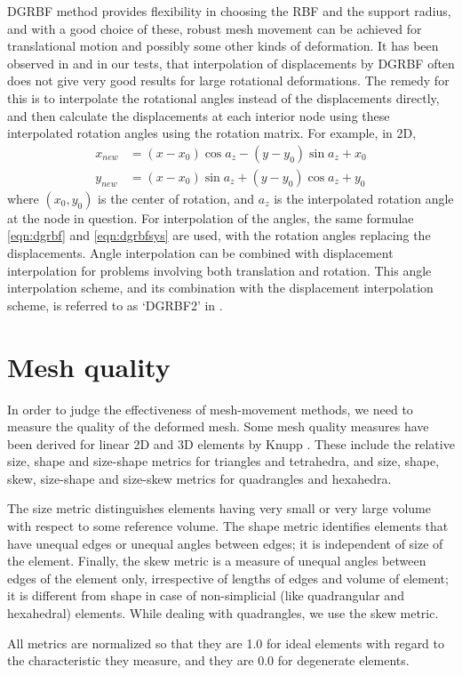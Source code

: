  DGRBF method provides flexibility in choosing the RBF and the support radius, and with a good choice of these, robust mesh movement can be achieved for translational motion and possibly some other kinds of deformation. It has been observed in \cite{mm:dgrbf} and in our tests, that interpolation of displacements by DGRBF often does not give very good results for large rotational deformations. The remedy for this is to interpolate the rotational angles instead of the displacements directly, and then calculate the displacements at each interior node using these interpolated rotation angles using the rotation matrix. For example, in 2D,
 \begin{align}
 x_{new} &= (x-x_0)\cos a_z - (y-y_0)\sin a_z + x_0 \\
 y_{new} &= (x-x_0)\sin a_z + (y-y_0)\cos a_z + y_0
 \end{align}
 where $(x_0,y_0)$ is the center of rotation, and $a_z$ is the interpolated rotation angle at the node in question. For interpolation of the angles, the same formulae \eqref{eqn:dgrbf} and \eqref{eqn:dgrbfsys} are used, with the rotation angles replacing the displacements. Angle interpolation can be combined with displacement interpolation for problems involving both translation and rotation. This angle interpolation scheme, and its combination with the displacement interpolation scheme, is referred to as `DGRBF2' in \cite{mm:dgrbf}.
 
 \section{Mesh quality}
 
 In order to judge the effectiveness of mesh-movement methods, we need to measure the quality of the deformed mesh. Some mesh quality measures have been derived for linear 2D and 3D elements by Knupp \cite{qualknupp}. These include the relative size, shape and size-shape metrics for triangles and tetrahedra, and size, shape, skew, size-shape and size-skew metrics for quadrangles and hexahedra.
 
 The size metric distinguishes elements having very small or very large volume with respect to some reference volume. The shape metric identifies elements that have unequal edges or unequal angles between edges; it is independent of size of the element. Finally, the skew metric is a measure of unequal angles between edges of the element only, irrespective of lengths of edges and volume of element; it is different from shape in case of non-simplicial (like quadrangular and hexahedral) elements. While dealing with quadrangles, we use the skew metric.
 
 All metrics are normalized so that they are 1.0 for ideal elements with regard to the characteristic they measure, and they are 0.0 for degenerate elements. 
 
